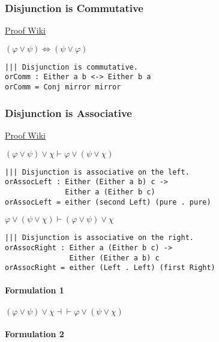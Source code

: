 \documentclass{acm_proc_article-sp}
\begin{document}
\subsubsection{Disjunction is
Commutative}\label{disjunction-is-commutative}

\href{https://proofwiki.org/wiki/Rule_of_Commutation/Disjunction}{Proof
Wiki}

\((\varphi \lor \psi) \iff (\psi \lor \varphi)\)

\begin{verbatim}
||| Disjunction is commutative.
orComm : Either a b <-> Either b a
orComm = Conj mirror mirror
\end{verbatim}

\subsubsection{Disjunction is
Associative}\label{disjunction-is-associative}

\href{https://proofwiki.org/wiki/Rule_of_Association/Disjunction}{Proof
Wiki}

\((\varphi \lor \psi) \lor \chi \vdash \varphi \lor (\psi \lor \chi)\)

\begin{verbatim}
||| Disjunction is associative on the left.
orAssocLeft : Either (Either a b) c ->
              Either a (Either b c)
orAssocLeft = either (second Left) (pure . pure)
\end{verbatim}

\(\varphi \lor (\psi \lor \chi) \vdash (\varphi \lor \psi) \lor \chi\)

\begin{verbatim}
||| Disjunction is associative on the right.
orAssocRight : Either a (Either b c) ->
               Either (Either a b) c
orAssocRight = either (Left . Left) (first Right)
\end{verbatim}

\paragraph{Formulation 1}\label{formulation-1-2}

\((\varphi \lor \psi) \lor \chi \dashv\vdash \varphi \lor (\psi \lor \chi)\)

\paragraph{Formulation 2}\label{formulation-2-2}
\end{document}
